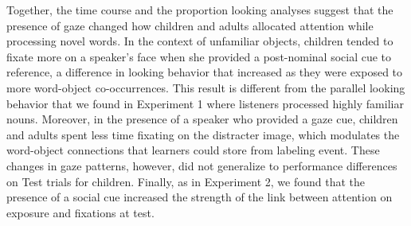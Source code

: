\documentclass[oneside]{report}
\begin{document}
Together, the time course and the proportion looking analyses suggest
that the presence of gaze changed how children and adults allocated
attention while processing novel words. In the context of unfamiliar
objects, children tended to fixate more on a speaker's face when she
provided a post-nominal social cue to reference, a difference in looking
behavior that increased as they were exposed to more word-object
co-occurrences. This result is different from the parallel looking
behavior that we found in Experiment 1 where listeners processed highly
familiar nouns. Moreover, in the presence of a speaker who provided a
gaze cue, children and adults spent less time fixating on the distracter
image, which modulates the word-object connections that learners could
store from labeling event. These changes in gaze patterns, however, did
not generalize to performance differences on Test trials for children.
Finally, as in Experiment 2, we found that the presence of a social cue
increased the strength of the link between attention on exposure and
fixations at test.
\end{document}
